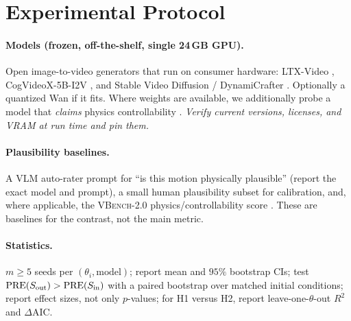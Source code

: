 \section{Experimental Protocol}
\label{sec:protocol}

\paragraph{Models (frozen, off-the-shelf, single 24\,GB GPU).}
Open image-to-video generators that run on consumer hardware:
LTX-Video \citep{hacohen2024ltxvideo}, CogVideoX-5B-I2V
\citep{yang2024cogvideox}, and Stable Video Diffusion / DynamiCrafter
\citep{blattmann2023svd,xing2024dynamicrafter}. Optionally a quantized Wan
\citep{wan2025} if it fits. Where weights are available, we additionally probe a
model that \emph{claims} physics controllability
\citep{physchoreo2025,phantom2026,physvideo2026}. \emph{Verify current versions,
licenses, and VRAM at run time and pin them.}

\paragraph{Plausibility baselines.}
A VLM auto-rater prompt for ``is this motion physically plausible'' (report the
exact model and prompt), a small human plausibility subset for calibration, and,
where applicable, the \textsc{VBench-2.0} physics/controllability score
\citep{vbench2_2025}. These are baselines for the contrast, not the main metric.

\paragraph{Statistics.}
$m\ge 5$ seeds per $(\theta_i,\text{model})$; report mean and $95\%$ bootstrap
CIs; test $\mathrm{PRE}(S_\text{out})>\mathrm{PRE}(S_\text{in})$ with a paired bootstrap over
matched initial conditions; report effect sizes, not only $p$-values; for H1
versus H2, report leave-one-$\theta$-out $R^2$ and $\Delta$AIC.

